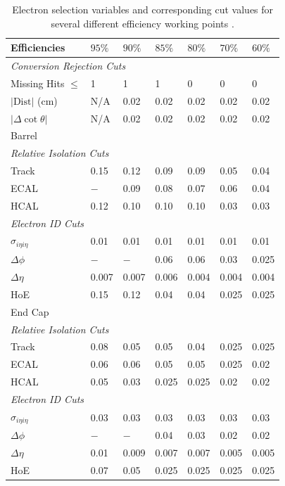 \begin{table}[htbp]
  \begin{center}
    \begin{tabular}{lllllll} 
\toprule
Efficiencies& $95\%$& $90\%$& $85\%$& $80\%$& $70\%$& $60\%$\\
\midrule
\multicolumn{7}{l}{\emph{Conversion Rejection Cuts}}\\ 
Missing Hits $\leq$& 1& 1& 1& 0& 0& 0\\
$\vert \text{Dist} \vert$ (cm) & N/A& 0.02& 0.02& 0.02& 0.02& 0.02\\
$\vert\Delta\cot\theta\vert$& N/A& 0.02& 0.02& 0.02& 0.02& 0.02\\
\midrule
\multicolumn{7}{l}{Barrel}\\ 
\multicolumn{7}{l}{\emph{Relative Isolation Cuts}} \\
Track    & 0.15& 0.12& 0.09& 0.09& 0.05& 0.04\\
ECAL     & $-$ & 0.09& 0.08& 0.07& 0.06& 0.04\\
HCAL     & 0.12& 0.10& 0.10& 0.10& 0.03& 0.03\\
\multicolumn{7}{l}{\emph{Electron ID Cuts}} \\
$\sigma_{i\eta i\eta}$& 0.01& 0.01& 0.01& 0.01& 0.01& 0.01\\
$\Delta \phi$& $-$ & $-$ & 0.06& 0.06& 0.03& 0.025\\
$\Delta \eta$& 0.007& 0.007& 0.006& 0.004& 0.004& 0.004\\
HoE& 0.15& 0.12& 0.04& 0.04& 0.025& 0.025\\
\midrule
\multicolumn{7}{l}{End Cap}\\ 
\multicolumn{7}{l}{\emph{Relative Isolation Cuts}} \\
Track    & 0.08& 0.05& 0.05& 0.04& 0.025& 0.025\\
ECAL     & 0.06& 0.06& 0.05& 0.05& 0.025& 0.02\\
HCAL     & 0.05& 0.03& 0.025& 0.025& 0.02& 0.02\\
\multicolumn{7}{l}{\emph{Electron ID Cuts}} \\
$\sigma_{i\eta i\eta}$& 0.03& 0.03& 0.03& 0.03& 0.03& 0.03\\
$\Delta \phi$& $-$ & $-$ & 0.04& 0.03& 0.02& 0.02\\
$\Delta \eta$& 0.01& 0.009& 0.007& 0.007& 0.005& 0.005\\
HoE& 0.07& 0.05& 0.025& 0.025& 0.025& 0.025\\
\bottomrule
    \end{tabular}
    \caption[Electron selection variables and corresponding cut values for
several different efficiency working points.] {Electron selection variables and
corresponding cut values for several different efficiency working points
\cite{nikos,daskalakis2009data,simplecutbasedeleid}.\label{tab:electronwp} }
  \end{center}
\end{table}

